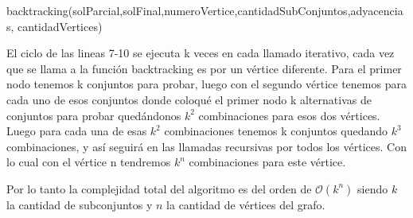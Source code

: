 \begin{algorithm}
 \begin{algorithmic}[1]\parskip=1mm
 \caption{backtracking(solParcial,solFinal,numeroVertice,cantidadSubConjuntos,adyacencias, cantidadVertices)}
  \end{algorithmic}
  \end{algorithm}

El ciclo de las lineas 7-10 se ejecuta k veces en cada llamado iterativo, cada vez que se llama a la función backtracking es por un vértice diferente. 
Para el primer nodo tenemos k conjuntos para probar, luego con el segundo vértice tenemos para cada uno de esos conjuntos donde coloqué el primer nodo k alternativas de conjuntos para probar quedándonos $k^2$ combinaciones para esos dos vértices. Luego para cada una de esas $k^2$ combinaciones tenemos k conjuntos quedando $k^3$ combinaciones, y así seguirá en las llamadas recursivas por todos los vértices. Con lo cual con el vértice n tendremos $k^n$ combinaciones para este vértice.

Por lo tanto la complejidad total del algoritmo es del orden de $\mathcal{O}(k^n)$ siendo $k$ la cantidad de subconjuntos y $n$ la cantidad de vértices del grafo.

